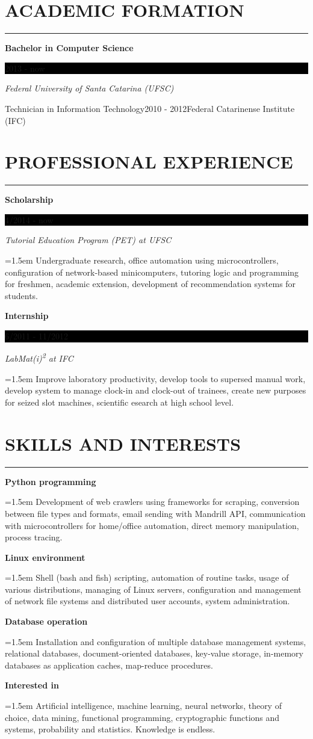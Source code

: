 \documentclass{article}
\newcommand{\formationentry}[4]{%
	\noindent \textbf{#1} \hfill
	\colorbox{black}{%
		\parbox[c][1em]{8em}{%
			\hfill \color{white} #2
		}
	} \par
	\noindent \textit{#3} \par
	\normalsize
	\vspace{1em}
}
\newcommand{\experienceentry}[4]{%
	\noindent \textbf{#1} \hfill
	\colorbox{black}{%
		\parbox[c][1em]{8em}{%
			\hfill \color{white} #2
		}
	} \par
	\noindent \textit{#3} \par
	\noindent \hangindent=1.5em \hangafter=0 \small #4 \par
	\normalsize
	\vspace{1em}
}
\newcommand{\skillentry}[2]{%
	\noindent \textbf{#1} \hfill \par
	\noindent \hangindent=1.5em \hangafter=0 \small #2 \par
	\normalsize
	\vspace{1em}
}
\newenvironment{main}{%
\noindent
\begin{minipage}[t]{\dimexpr0.75\textwidth-1.5em}%
\let\oldsection\section
\renewcommand{\section}[1]{\oldsection*{\uppercase{##1}}\vspace{-0.5em}\hrule\vspace{1em}}
}{%
\let\section\oldsection
\end{minipage}%
}
\begin{document}
\begin{main}%
\section{Academic Formation}
\formationentry{Bachelor in Computer Science}{2013 - now}{Federal University
of Santa Catarina (UFSC)}

\formationentry{Technician in Information Technology}{2010 - 2012}{Federal
Catarinense Institute (IFC)}


\section{Professional Experience}
\experienceentry{Scholarship}{4/2014 - now}{Tutorial Education Program (PET) at
UFSC}{Undergraduate research, office automation using microcontrollers, configuration of network-based minicomputers, tutoring logic and programming for freshmen, academic extension, development of recommendation systems for students.}

\experienceentry{Internship}{6/2011 - 11/2012}{LabMat(i)\textsuperscript{2} at
IFC}{Improve laboratory productivity, develop tools to supersed manual work, develop system to manage clock-in and clock-out of trainees, create new purposes for seized slot machines, scientific esearch at high school level.}


\section{Skills and Interests}
\skillentry{Python programming}{Development of web crawlers using frameworks
for scraping, conversion between file types and formats, email sending with
Mandrill API, communication with microcontrollers for home/office automation,
direct memory manipulation, process tracing.}

\skillentry{Linux environment}{Shell (bash and fish) scripting, automation of routine tasks, usage of various distributions, managing of Linux servers, configuration and management of network file systems and distributed user accounts, system administration.}

\skillentry{Database operation}{Installation and configuration of multiple database management systems, relational databases, document-oriented databases, key-value storage, in-memory databases as application caches, map-reduce procedures.}

\skillentry{Interested in}{Artificial intelligence, machine learning, neural networks, theory of choice, data mining, functional programming, cryptographic functions and systems, probability and statistics. Knowledge is endless.}



\end{main}
\end{document}
